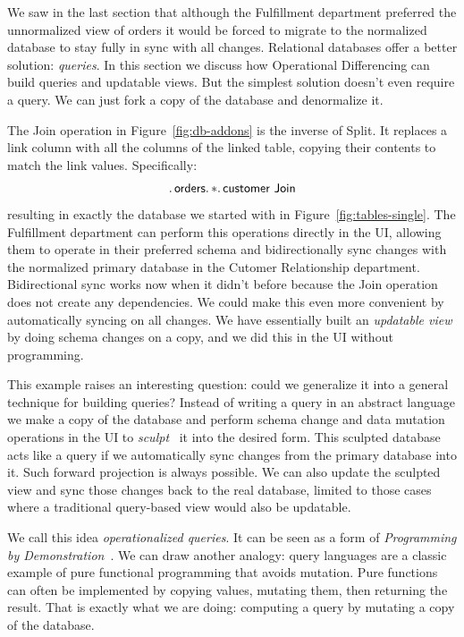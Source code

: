 \documentclass[english,submission]{programming}
\theoremstyle{definition}
\begin{document}
We saw in the last section that although the Fulfillment department preferred the unnormalized view of orders it would be forced to migrate to the normalized database to stay fully in sync with all changes. Relational databases offer a better solution: \textit{queries}. In this section we discuss how Operational Differencing can build queries and updatable views. But the simplest solution doesn't even require a query. We can just fork a copy of the database and denormalize it.

The \textsf{Join} operation in Figure~\ref{fig:db-addons}
is the inverse of \textsf{Split}. It replaces a link column with all the columns of the linked table, copying their contents to match the link values.
Specifically:
\[
\ldotp \textsf{orders}\ldotp * \ldotp \textsf{customer Join} \\
\]
resulting in exactly the database we started with in Figure~\ref{fig:tables-single}.
The Fulfillment department can perform this operations directly in the UI, allowing them
to operate in their preferred schema and bidirectionally sync changes with the normalized primary database in the Cutomer Relationship department. Bidirectional sync works now when it didn't before because the \textsf{Join} operation does not create any dependencies. We could make this even more convenient by automatically syncing on all changes. We have essentially built an \textit{updatable view} by doing schema changes on a copy, and we did this in the UI without programming.

This example raises an interesting question: could we generalize it into a general technique for building queries? Instead of writing a query in an abstract language we make a copy of the database and perform schema change and data mutation operations in the UI to \textit{sculpt}~\cite{sculpin} it into the desired form. This sculpted database acts like a query if we automatically sync changes from the primary database into it. Such forward projection is always possible. We can also update the sculpted view and sync those changes back to the real database, limited to those cases where a traditional query-based view would also be updatable.

We call this idea \textit{operationalized queries}. It can be seen as a form of \textit{Programming by Demonstration}~\cite{cypher93-pbd}. We can draw another analogy: query languages are a classic example of pure functional programming that avoids mutation. Pure functions can often be implemented by copying values, mutating them, then returning the result. That is exactly what we are
doing: computing a query by mutating a copy of the database.
\end{document}

